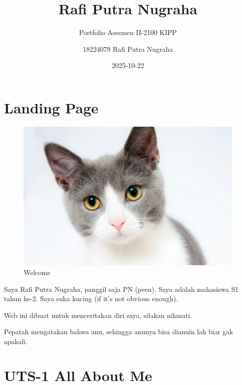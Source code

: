 \documentclass[
  letterpaper,
  DIV=11,
  numbers=noendperiod]{scrreprt}
\title{Rafi Putra Nugraha}
\subtitle{Portfolio Asesmen II-2100 KIPP}
\author{18224079 Rafi Putra Nugraha}
\date{2025-10-22}
\renewcommand*\contentsname{Table of contents}
\newcommand\contentsname{Table of contents}
\begin{document}
\maketitle

\renewcommand*\contentsname{Table of contents}
{
\hypersetup{linkcolor=}
\setcounter{tocdepth}{2}
\tableofcontents
}

\chapter*{Landing Page}\label{landing-page}


\begin{figure}[H]

{\centering \includegraphics[width=1\textwidth,height=\textheight]{images/cat.jpg}

}

\caption{Welcome}

\end{figure}%

Saya Rafi Putra Nugraha, panggil saja PN (peen). Saya adalah mahasiswa
S1 tahun ke-2. Saya suka kucing (if it's not obvious enough).

Web ini dibuat untuk menceritakan diri saya, silakan nikmati.

Pepatah mengatakan bahwa anu, sehingga anunya bisa dianuin lah biar gak
apakali.


\chapter{UTS-1 All About Me}\label{uts-1-all-about-me}
\end{document}
